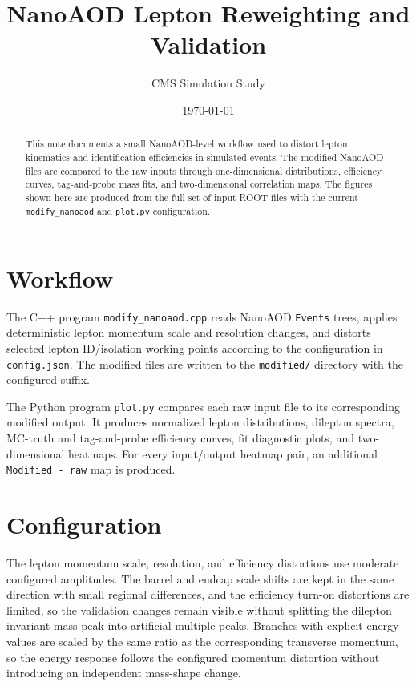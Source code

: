 \documentclass[11pt,a4paper]{article}
\title{\bfseries NanoAOD Lepton Reweighting and Validation}
\author{CMS Simulation Study}
\date{\today}
\begin{document}
\maketitle

\begin{abstract}
This note documents a small NanoAOD-level workflow used to distort lepton
kinematics and identification efficiencies in simulated events.  The modified
NanoAOD files are compared to the raw inputs through one-dimensional
distributions, efficiency curves, tag-and-probe mass fits, and two-dimensional
correlation maps.  The figures shown here are produced from the full set of
input ROOT files with the current \texttt{modify\_nanoaod} and \texttt{plot.py}
configuration.
\end{abstract}

\section{Workflow}

The C++ program \texttt{modify\_nanoaod.cpp} reads NanoAOD \texttt{Events}
trees, applies deterministic lepton momentum scale and resolution changes, and
distorts selected lepton ID/isolation working points according to the
configuration in \texttt{config.json}.  The modified files are written to the
\texttt{modified/} directory with the configured suffix.

The Python program \texttt{plot.py} compares each raw input file to its
corresponding modified output.  It produces normalized lepton distributions,
dilepton spectra, MC-truth and tag-and-probe efficiency curves, fit diagnostic
plots, and two-dimensional heatmaps.  For every input/output heatmap pair, an
additional \texttt{Modified - raw} map is produced.

\section{Configuration}

The lepton momentum scale, resolution, and efficiency distortions use moderate
configured amplitudes.  The barrel and endcap scale shifts are kept in the
same direction with small regional differences, and the efficiency turn-on
distortions are limited, so the validation changes remain visible without
splitting the dilepton invariant-mass peak into artificial multiple peaks.
Branches with explicit energy values are scaled by the same ratio as the
corresponding transverse momentum, so the energy response follows the
configured momentum distortion without introducing an independent mass-shape
change.
\end{document}
